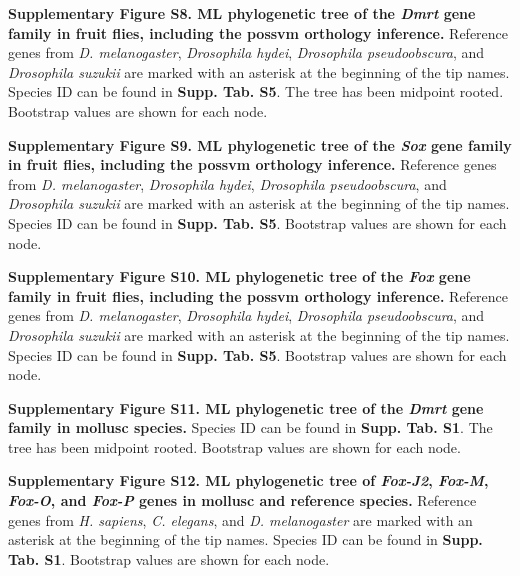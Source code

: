 \documentclass[../main.tex]{subfiles}
\begin{document}
{    \vspace{5mm}

    \noindent\textbf{Supplementary Figure S8. ML phylogenetic tree of the \textit{Dmrt} gene family in fruit flies, including the possvm orthology inference.} Reference genes from \textit{D. melanogaster}, \textit{Drosophila hydei}, \textit{Drosophila pseudoobscura}, and \textit{Drosophila suzukii} are marked with an asterisk at the beginning of the tip names. Species ID can be found in \textbf{Supp. Tab. S5}. The tree has been midpoint rooted. Bootstrap values are shown for each node.

    \vspace{5mm}

    \noindent\textbf{Supplementary Figure S9. ML phylogenetic tree of the \textit{Sox} gene family in fruit flies, including the possvm orthology inference.} Reference genes from \textit{D. melanogaster}, \textit{Drosophila hydei}, \textit{Drosophila pseudoobscura}, and \textit{Drosophila suzukii} are marked with an asterisk at the beginning of the tip names. Species ID can be found in \textbf{Supp. Tab. S5}. Bootstrap values are shown for each node.

    \vspace{5mm}

    \noindent\textbf{Supplementary Figure S10. ML phylogenetic tree of the \textit{Fox} gene family in fruit flies, including the possvm orthology inference.} Reference genes from \textit{D. melanogaster}, \textit{Drosophila hydei}, \textit{Drosophila pseudoobscura}, and \textit{Drosophila suzukii} are marked with an asterisk at the beginning of the tip names. Species ID can be found in \textbf{Supp. Tab. S5}. Bootstrap values are shown for each node.

    \vspace{5mm}

    \noindent\textbf{Supplementary Figure S11. ML phylogenetic tree of the \textit{Dmrt} gene family in mollusc species.} Species ID can be found in \textbf{Supp. Tab. S1}. The tree has been midpoint rooted. Bootstrap values are shown for each node.

    \vspace{5mm}

    \noindent\textbf{Supplementary Figure S12. ML phylogenetic tree of \textit{Fox-J2}, \textit{Fox-M}, \textit{Fox-O}, and \textit{Fox-P} genes in mollusc and reference species.} Reference genes from \textit{H. sapiens}, \textit{C. elegans}, and \textit{D. melanogaster} are marked with an asterisk at the beginning of the tip names. Species ID can be found in \textbf{Supp. Tab. S1}. Bootstrap values are shown for each node.

}
\end{document}
